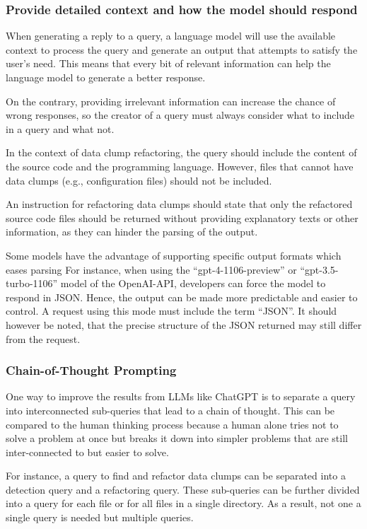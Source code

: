 \subsubsection{Provide detailed context and how the model should respond}

When generating a reply to a query, a language model will use the available context to process the query and generate an output that attempts to satisfy the user's need. This means that every bit of relevant information can help the language model to generate a better response.

On the contrary, providing irrelevant information can increase the chance of wrong responses, so the creator of a query must always consider what to include in a query and what not. 

In the context of data clump refactoring, the query should include the content of the source code and the programming language. However, files that cannot have data clumps (e.g., configuration files) should not be included.

An instruction for refactoring data clumps should state that only the refactored source code files should be returned without providing explanatory texts or other information, as they can hinder the parsing of the output. 

Some models have the advantage of supporting specific output formats which eases parsing
For instance, when using the \enquote{gpt-4-1106-preview} or \enquote{gpt-3.5-turbo-1106} model of the OpenAI-\ac{API}, developers can force the model to respond in \ac{JSON}. Hence, the output can be made more predictable and easier to control. A request using this mode must include the term \enquote{\ac{JSON}}. It should however be noted, that the precise structure of the \ac{JSON} returned may still differ from the request. 


\subsubsection{Chain-of-Thought Prompting}\label{sec:chain of thought}

One way to improve the results from \acp{LLM} like ChatGPT is to separate a query into interconnected sub-queries that lead to a chain of thought. This can be compared to the human thinking process because a human alone tries not to solve a problem at once but breaks it down into simpler problems that are still inter-connected to but easier to solve. \cite{Wei2022ChainOT}

For instance, a query to find and refactor data clumps can be separated into a detection query and a refactoring query. These sub-queries can be further divided into a query for each file or for all files in a single directory. As a result, not one a single query is needed but multiple queries. 

